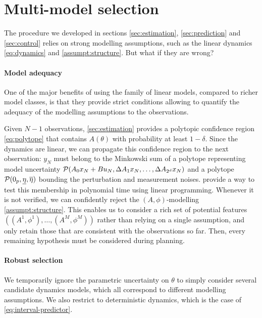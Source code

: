 \section{Multi-model selection}
\label{sec:multi-model}

The procedure we developed in sections \ref{sec:estimation}, \ref{sec:prediction} and \ref{sec:control} relies on strong modelling assumptions, such as the linear dynamics \eqref{eq:dynamics} and \autoref{assumpt:structure}. But what if they are wrong?

\paragraph{Model adequacy}

One of the major benefits of using the family of linear models, compared to richer model classes, is that they provide strict conditions allowing to quantify the adequacy of the modelling assumptions to the observations.

Given $N-1$ observations, \autoref{sec:estimation} provides a polytopic confidence region \eqref{eq:polytope} that contains $A(\theta)$ with probability at least $1-\delta$. Since the dynamics are linear, we can propagate this confidence region to the next observation: $y_{N}$ must belong to the Minkowski sum of a polytope representing model uncertainty $\mathcal{P}(A_{0} x_N + Bu_N, \Delta A_{1}x_N,\dots, \Delta A_{2^d}x_N)$ and a polytope $\mathcal{P}(0_p, \underline{\eta}, \overline{\eta})$ bounding the perturbation and measurement noises. \citet{delos2015} provide a way to test this membership in polynomial time using linear programming. Whenever it is not verified, we can confidently reject the $(A,\phi)$-modelling \autoref{assumpt:structure}. This enables us to consider a rich set of potential features $\left((A^1, \phi^1), \dots, (A^M, \phi^M)\right)$ rather than relying on a single assumption, and only retain those that are consistent with the observations so far. Then, every remaining hypothesis must be considered during planning.

\paragraph{Robust selection}

We temporarily ignore the parametric uncertainty on $\theta$ to simply consider several candidate dynamics models, which all correspond to different modelling assumptions. We also restrict to deterministic dynamics, which is the case of \eqref{eq:interval-predictor}.

